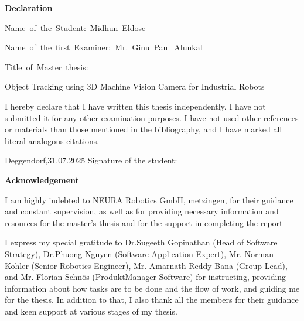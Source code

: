 \documentclass[12pt]{article}
\begin{document}
\linespread{1.5}

\textbf{Declaration}

\vspace{0.5cm}

\mbox{Name of the Student: Midhun Eldose}

\vspace{0.5cm}

\mbox{Name of the first Examiner:  Mr. Ginu Paul Alunkal }

\vspace{1 cm}

\mbox{Title of Master thesis:}

\vspace{0.5 cm}

Object Tracking using 3D Machine Vision Camera for Industrial Robots
\vspace{1.5 cm}

 I hereby declare that I have written this thesis independently. I have not submitted it for any other examination purposes. I have not used other references or materials than those mentioned in the bibliography, and I have marked all literal analogous citations.

 \vspace{1.5 cm}

Deggendorf,31.07.2025
\hspace{4 cm}
Signature of the student:


\linespread{1.5}
\newpage

\tableofcontents
\newpage
\lisToFfigures
{}
\newpage
\lisToFtables
{}
\newpage

\newpage

\begin{center}
    \textbf{Acknowledgement}
\end{center}
    

    I am highly indebted to NEURA Robotics GmbH, metzingen, for their guidance and constant supervision, as well as for providing necessary information and resources for the master's thesis and for the support in completing the report

    \vspace{1cm}
    
    I express my special gratitude to Dr.Sugeeth Gopinathan (Head of Software Strategy), Dr.Phuong Nguyen (Software Application Expert), Mr. Norman Kohler (Senior Robotics Engineer), Mr. Amarnath Reddy Bana (Group Lead), and Mr. Florian Schnös (ProduktManager Software) for instructing, providing information about how tasks are to be done and the flow of work, and guiding me for the thesis. In addition to that, I also thank all the members for their guidance and keen support at various stages of my thesis.
\end{document}
